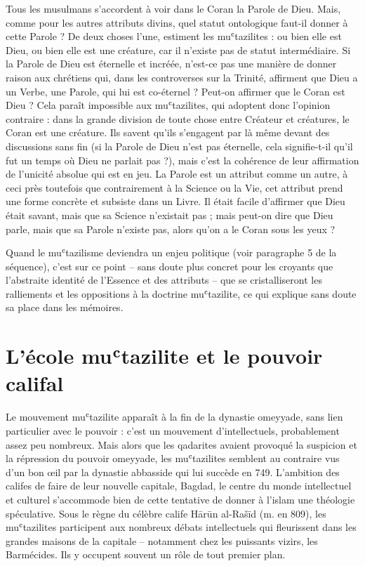 Tous les musulmans s'accordent à voir dans le Coran la Parole de Dieu.
Mais, comme pour les autres attributs divins, quel statut ontologique
faut-il donner à cette Parole ? De deux choses l'une, estiment les
muʿtazilites : ou bien elle est Dieu, ou bien elle est une créature, car
il n'existe pas de statut intermédiaire. Si la Parole de Dieu est
éternelle et incréée, n'est-ce pas une manière de donner raison aux
chrétiens qui, dans les controverses sur la Trinité, affirment que Dieu
a un Verbe, une Parole, qui lui est co-éternel ? Peut-on affirmer que le
Coran est Dieu ? Cela paraît impossible aux muʿtazilites, qui adoptent
donc l'opinion contraire : dans la grande division de toute chose entre
Créateur et créatures, le Coran est une créature. Ils savent qu'ils
s'engagent par là même devant des discussions sans fin (si la Parole de
Dieu n'est pas éternelle, cela signifie-t-il qu'il fut un temps où Dieu
ne parlait pas ?), mais c'est la cohérence de leur affirmation de
l'unicité absolue qui est en jeu. La Parole est un attribut comme un
autre, à ceci près toutefois que contrairement à la Science ou la Vie,
cet attribut prend une forme concrète et subsiste dans un Livre. Il
était facile d'affirmer que Dieu était savant, mais que sa Science
n'existait pas ; mais peut-on dire que Dieu parle, mais que sa Parole
n'existe pas, alors qu'on a le Coran sous les yeux ?

Quand le muʿtazilisme deviendra un enjeu politique (voir paragraphe 5 de
la séquence), c'est sur ce point -- sans doute plus concret pour les
croyants que l'abstraite identité de l'Essence et des attributs -- que
se cristalliseront les ralliements et les oppositions à la doctrine
muʿtazilite, ce qui explique sans doute sa place dans les mémoires.

\hypertarget{luxe9cole-muux2bftazilite-et-le-pouvoir-califal}{%
\section{L'école muʿtazilite et le pouvoir
califal}\label{luxe9cole-muux2bftazilite-et-le-pouvoir-califal}}

Le mouvement muʿtazilite apparaît à la fin de la dynastie omeyyade, sans
lien particulier avec le pouvoir : c'est un mouvement d'intellectuels,
probablement assez peu nombreux. Mais alors que les qadarites avaient
provoqué la suspicion et la répression du pouvoir omeyyade, les
muʿtazilites semblent au contraire vus d'un bon œil par la dynastie
abbasside qui lui succède en 749. L'ambition des califes de faire de
leur nouvelle capitale, Bagdad, le centre du monde intellectuel et
culturel s'accommode bien de cette tentative de donner à l'islam une
théologie spéculative. Sous le règne du célèbre calife Hārūn al-Rašīd
(m. en 809), les muʿtazilites participent aux nombreux débats
intellectuels qui fleurissent dans les grandes maisons de la capitale --
notamment chez les puissants vizirs, les Barmécides. Ils y occupent
souvent un rôle de tout premier plan.

